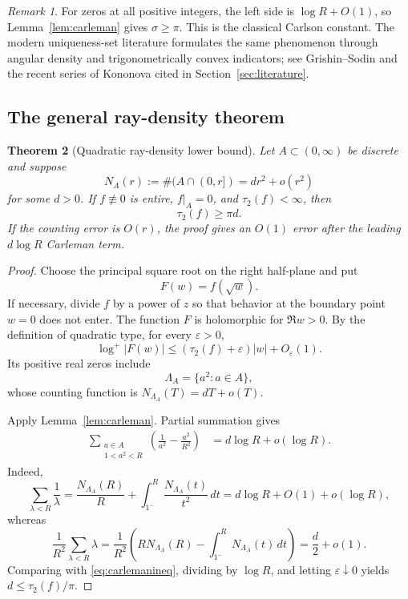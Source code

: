 \documentclass[11pt,oneside]{article}
\newtheorem{theorem}{Theorem}[section]
\theoremstyle{definition}
\theoremstyle{remark}
\newtheorem{remark}[theorem]{Remark}
\begin{document}
\begin{remark}
For zeros at all positive integers, the left side is $\log R+O(1)$, so
Lemma~\ref{lem:carleman} gives $\sigma\ge\pi$.  This is the classical Carlson constant.
The modern uniqueness-set literature formulates the same phenomenon through angular density
and trigonometrically convex indicators; see Grishin--Sodin and the recent series of
Kononova cited in Section~\ref{sec:literature}.
\end{remark}

\subsection{The general ray-density theorem}

\begin{theorem}[Quadratic ray-density lower bound]
\label{thm:raydensity}
Let $A\subset(0,\infty)$ be discrete and suppose
\[
 N_A(r):=\#(A\cap(0,r])=d r^2+o(r^2)
\]
for some $d>0$.  If $f\not\equiv0$ is entire, $f|_A=0$, and $\tau_2(f)<\infty$, then
\begin{equation}
 \tau_2(f)\ge\pi d.
 \label{eq:raylower}
\end{equation}
If the counting error is $O(r)$, the proof gives an $O(1)$ error after the leading
$d\log R$ Carleman term.
\end{theorem}

\begin{proof}
Choose the principal square root on the right half-plane and put
\[
 F(w)=f(\sqrt w).
\]
If necessary, divide $f$ by a power of $z$ so that behavior at the boundary point $w=0$
does not enter.  The function $F$ is holomorphic for $\Re w>0$.  By the definition of
quadratic type, for every $\varepsilon>0$,
\[
 \log^+|F(w)|
 \le(\tau_2(f)+\varepsilon)|w|+O_\varepsilon(1).
\]
Its positive real zeros include
\[
 \Lambda_A=\{a^2:a\in A\},
\]
whose counting function is $N_{\Lambda_A}(T)=dT+o(T)$.

Apply Lemma~\ref{lem:carleman}.  Partial summation gives
\[
 \begin{aligned}
 \sum_{\substack{a\in A\\1<a^2<R}}
 \left(\frac1{a^2}-\frac{a^2}{R^2}\right)
 &=d\log R+o(\log R).
 \end{aligned}
\]
Indeed,
\[
 \sum_{\lambda<R}\frac1\lambda
 =\frac{N_{\Lambda_A}(R)}R+
   \int_{1^-}^{R}\frac{N_{\Lambda_A}(t)}{t^2}\,dt
 =d\log R+O(1)+o(\log R),
\]
whereas
\[
 \frac1{R^2}\sum_{\lambda<R}\lambda
 =\frac1{R^2}\left(RN_{\Lambda_A}(R)-
   \int_{1^-}^{R}N_{\Lambda_A}(t)\,dt\right)
 =\frac d2+o(1).
\]
Comparing with \eqref{eq:carlemanineq}, dividing by $\log R$, and letting
$\varepsilon\downarrow0$ yields $d\le\tau_2(f)/\pi$.
\end{proof}
\end{document}
